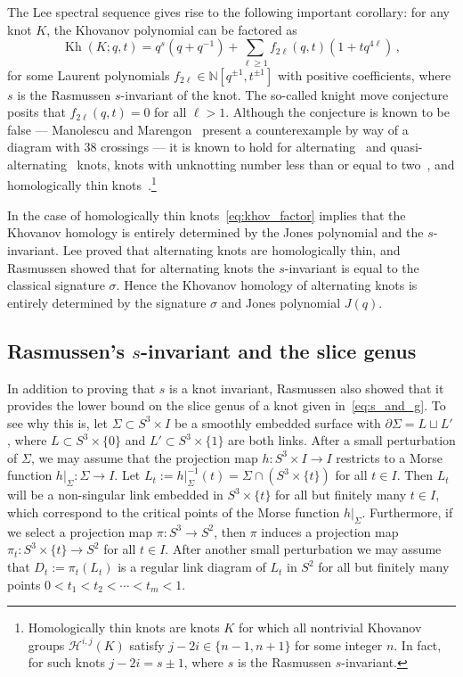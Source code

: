 \documentclass[11pt]{article}
\DeclareMathOperator{\Kh}{Kh}
\numberwithin{equation}{section}
\begin{document}
The Lee spectral sequence gives rise to the following important corollary: for any knot $K$, the Khovanov polynomial can be factored as
\begin{equation}
\Kh(K;q,t) = q^s(q+q^{-1}) + \sum_{\ell\ge 1} f_{2\ell}(q,t)(1+t q^{4\ell}) \,,
\label{eq:khov_factor}
\end{equation}
for some Laurent polynomials $f_{2\ell} \in \mathbb{N}[q^{\pm 1}, t^{\pm 1}]$ with positive coefficients, where $s$ is the Rasmussen $s$-invariant of the knot.
The so-called knight move conjecture posits that $f_{2\ell}(q,t)=0$ for all $\ell > 1$.
Although the conjecture is known to be false --- Manolescu and Marengon~\cite{manolescu2018knight} present a counterexample by way of a diagram with $38$ crossings --- it is known to hold for alternating~\cite{lee2002support} and quasi-alternating~\cite{manolescuquasialternating} knots, knots with unknotting number less than or equal to two~\cite{alishahi2019lee}, and homologically thin knots~\cite{rasmussen2010khovanov}.\footnote{
Homologically thin knots are knots $K$ for which all nontrivial Khovanov groups $\mathcal{H}^{i,j}(K)$ satisfy $j-2i \in \{n-1,n+1\}$ for some integer $n$. In fact, for such knots $j-2i = s\pm 1$, where $s$ is the Rasmussen $s$-invariant.}

In the case of homologically thin knots~\eqref{eq:khov_factor} implies that the Khovanov homology is entirely determined by the Jones polynomial and the $s$-invariant.  Lee proved that alternating knots are homologically thin, and Rasmussen showed that for alternating knots the $s$-invariant is equal to the classical signature $\sigma$.  Hence the Khovanov homology of alternating knots is entirely determined by the signature $\sigma$ and Jones polynomial $J(q)$.

\subsection{Rasmussen's $s$-invariant and the slice genus}
In addition to proving that $s$ is a knot invariant, Rasmussen also showed that it provides the lower bound on the slice genus of a knot given in~\eqref{eq:s_and_g}.
To see why this is, let $\Sigma \subset S^3 \times I$ be a smoothly embedded surface with $\partial \Sigma = L \sqcup L'$, where $L \subset S^3\times \{0\}$ and $L' \subset S^3 \times \{1\}$ are both links.
After a small perturbation of $\Sigma$, we may assume that the projection map $h:S^3 \times I \rightarrow I$ restricts to a Morse function $h|_\Sigma : \Sigma \rightarrow I$. Let $L_t := h|_\Sigma^{-1}(t) = \Sigma \cap (S^3 \times \{t\})$ for all $t \in I$.
Then $L_t$ will be a non-singular link embedded in $S^3 \times \{t\}$ for all but finitely many $t \in I$, which correspond to the critical points of the Morse function $h|_\Sigma$.
Furthermore, if we select a projection map $\pi:S^3 \rightarrow S^2$, then $\pi$ induces a projection map $\pi_t: S^3 \times \{t\} \rightarrow S^2$ for all $t \in I$.
After another small perturbation we may assume that $D_t:=\pi_t(L_t)$ is a regular link diagram of $L_t$ in $S^2$ for all but finitely many points $0 < t_1 < t_2 <\cdots < t_m<1$. 
\end{document}
